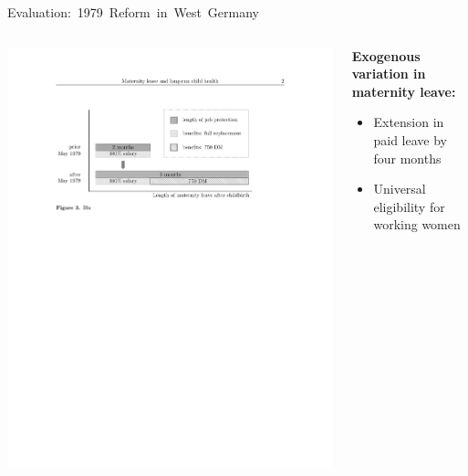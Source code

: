 \documentclass[aspectratio=169,handout]{beamer} %
\begin{document}

\begin{frame}{\mbox{Evaluation: 1979 Reform in West Germany}}



\begin{columns}
	\begin{column}{.6\textwidth}
		\includegraphics[width = \textwidth]{../../analysis/graphs/SOEP/Reform_shortened.pdf}
	\end{column}%
	\begin{column}{.40\textwidth}
		\textbf{Exogenous variation in maternity leave:}\begin{itemize}
		\item Extension in paid leave by four months
		\item Universal eligibility for working women
		

\end{itemize}
\end{column}
\end{columns}
\end{frame}
\end{document}
